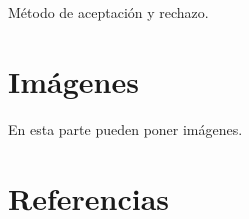 \documentclass[
letterpaper,
11pt, %
oneside,
onecolumn, %
article
]{memoir}
\theoremstyle{plain}
\theoremstyle{definition}
\theoremstyle{remark}
\begin{document}
\begin{algorithm}[H]
  \caption{Método de aceptación y rechazo.}
\end{algorithm}

\newpage

\chapter{Imágenes}

\noindent En esta parte pueden poner imágenes.

\newpage

\backmatter

\chapter*{Referencias}
\end{document}
